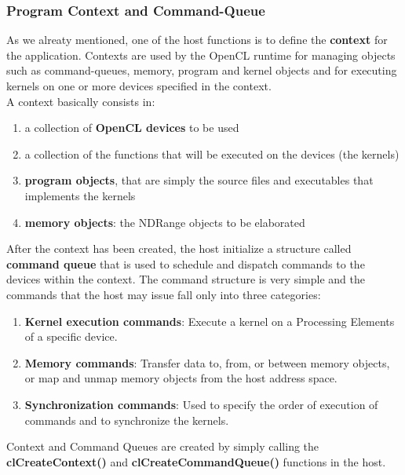 \subsubsection{Program Context and Command-Queue} \label{sect:context}

As we alreaty mentioned, one of the host functions is to define the \textbf{context} for the application. Contexts are used by the OpenCL runtime for managing objects such as command-queues, memory, program and kernel objects and for executing kernels on one or more devices specified in the context.\\
A context basically consists in:

\begin{enumerate}
	\item a collection of \textbf{OpenCL devices} to be used
	\item a collection of the functions that will be executed on the devices (the kernels)
	\item \textbf{program objects}, that are simply the source files and executables that implements the kernels
	\item \textbf{memory objects}: the NDRange objects to be elaborated
\end{enumerate}

After the context has been created, the host initialize a structure called \textbf{command queue} that is used to schedule and dispatch commands to the devices within the context. The command structure is very simple and the commands that the host may issue fall only into three categories:

\begin{enumerate}
	\item \textbf{Kernel execution commands}: Execute a kernel on a Processing Elements of a specific device.
	\item \textbf{Memory commands}: Transfer data to, from, or between memory objects, or map and unmap
memory objects from the host address space.
	\item	\textbf{Synchronization commands}: Used to specify the order of execution of commands and to synchronize the kernels.
\end{enumerate}

\begin{CLCode}
Context and Command Queues are created by simply calling the \textbf{clCreateContext()} and \textbf{clCreateCommandQueue() 
} functions in the host.
\end{CLCode}


